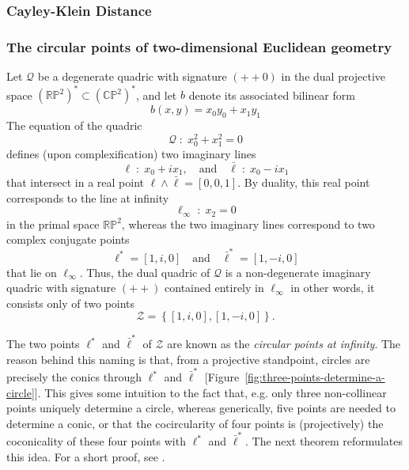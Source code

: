 \documentclass[10pt, a4paper]{article}
\theoremstyle{BoldTopSpacing}
\theoremstyle{BoldTopSpacing}
\theoremstyle{BoldTopSpacing}
\theoremstyle{BoldTopBottomSpacing}
\theoremstyle{BoldTopSpacing}
\theoremstyle{BoldTopBottomSpacing}
\theoremstyle{remark}
\begin{document}
\subsubsection{Cayley-Klein Distance}
\label{subsubsec:Cayley-Klein-Distance}

\subsubsection{The circular points of two-dimensional Euclidean geometry}
\label{subsubsec:circular-points-two-dimensional}

Let $\mathcal{Q}$ be a degenerate quadric with signature $(+ + 0)$ in the dual projective space $(\mathbb{R}\mathbb{P}^{2})^{*} \subset (\mathbb{C}\mathbb{P}^{2})^{*}$, and let $b$ denote its associated bilinear form
\[
    b(x, y) = x_{0}y_{0} + x_{1}y_{1}
\]
The equation of the quadric
\begin{equation}
\label{eq:degenerate-quadric-dual-space-two-dimensional}
    \mathcal{Q} \; : \; x_{0}^2 + x_{1}^2 = 0
\end{equation}
defines (upon complexification) two imaginary lines
\[
    \ell \; : \; x_{0} + i x_{1}, \quad \text{and} \quad \bar{\ell} \; : \; x_{0} - i x_{1}
\]
that intersect in a real point $\ell \wedge \bar{\ell} = [0, 0, 1]$. By duality, this real point corresponds to the line at infinity
\[
    \ell_{\infty} \; : \; x_{2} = 0
\]
in the primal space $\mathbb{R}\mathbb{P}^2$, whereas the two imaginary lines correspond to two complex conjugate points
\[
    \ell^{*} = [1, i, 0] \quad \text{and} \quad \bar{\ell}^{*} = [1, -i, 0]
\]
that lie on $\ell_{\infty}$. Thus, the dual quadric of $\mathcal{Q}$ is a non-degenerate imaginary quadric with signature $(+ +)$ contained entirely in $\ell_{\infty}$ \textemdash in other words, it consists only of two points
\begin{equation}
\label{circular-points-at-infinity}
    \mathcal{Z} = \left\{ [1, i, 0], [1, -i, 0] \right\}.
\end{equation}

The two points $\ell^{*}$ and $\bar{\ell}^{*}$ of $\mathcal{Z}$ are known as the \textit{circular points at infinity}. The reason behind this naming is that, from a projective standpoint, circles are precisely the conics through $\ell^{*}$ and $\bar{\ell}^{*}$ [Figure~\ref{fig:three-points-determine-a-circle}]. This gives some intuition to the fact that, e.g. only three non-collinear points uniquely determine a circle, whereas generically, five points are needed to determine a conic, or that the cocircularity of four points is (projectively) the coconicality of these four points with $\ell^{*}$ and $\bar{\ell}^{*}$. The next theorem reformulates this idea. For a short proof, see \cite[\textcolor{CitationColor}{Proposition~9.9}]{geometryII}. \par
\end{document}
